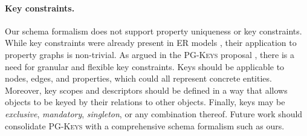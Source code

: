 \documentclass{report}
\theoremstyle{definition}
\newcommand{\otype}{\tau^\mathsf{o}}
\begin{document}




\paragraph{Key constraints.} Our schema formalism does not support property uniqueness or key constraints. While key constraints were already present in ER models \citep{chen1976entity}, their application to property graphs is non-trivial. As argued in the \textsc{PG-Keys} proposal \citep{angles2021keys}, there is a need for granular and flexible key constraints. Keys should be applicable to nodes, edges, and properties, which could all represent concrete entities. Moreover, key scopes and descriptors should be defined in a way that allows objects to be keyed by their relations to other objects. Finally, keys may be \emph{exclusive}, \emph{mandatory}, \emph{singleton}, or any combination thereof. Future work should consolidate \textsc{PG-Keys} with a comprehensive schema formalism such as ours.
\end{document}
